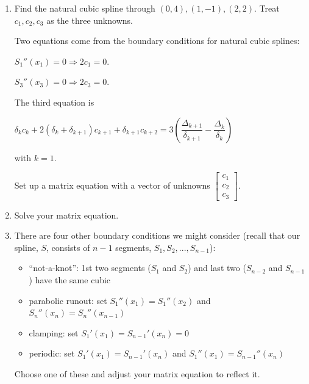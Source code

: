 \documentclass[12pt,letterpaper,noanswers]{exam}
\begin{document}
\begin{enumerate}[resume]
\item Find the natural cubic spline through $(0,4), (1,-1), (2,2)$.  Treat $c_1, c_2, c_3$ as the three unknowns.

Two equations come from the boundary conditions for natural cubic splines:

$S_1''(x_1) = 0 \Rightarrow 2c_1 = 0$.

$S_3''(x_3) = 0 \Rightarrow 2c_3 = 0$.

The third equation is

$\delta_k c_k + 2(\delta_k+\delta_{k+1})c_{k+1} + \delta_{k+1}c_{k+2} =3 \left(\dfrac{\Delta_{k+1}}{\delta_{k+1}} - \dfrac{\Delta_k}{\delta_k}\right)$

with $k = 1$.

Set up a matrix equation with a vector of unknowns $\left[\begin{array}{c} c_1 \\ c_2 \\ c_3 \end{array}\right]$.

\vspace{1in}

\item Solve your matrix equation.
\vspace{1in}

\item There are four other boundary conditions we might consider (recall that our spline, $S$, consists of $n-1$ segments, $S_1, S_2, ..., S_{n-1}$):
\begin{itemize}
 \item ``not-a-knot'': 1st two segments ($S_1$ and $S_2$) and last two ($S_{n-2}$ and $S_{n-1}$) have the same cubic
    \item parabolic runout: set $S_1''(x_1) = S_1''(x_2)$ and $S_n''(x_n) = S_n''(x_{n-1})$
    \item clamping: set $S_1'(x_1) = S_{n-1}'(x_n) = 0$
    \item periodic: set $S_1'(x_1) = S_{n-1}'(x_n)$ and $S_1''(x_1) = S_{n-1}''(x_n)$
\end{itemize}
Choose one of these and adjust your matrix equation to reflect it.

\vspace{1in}
\end{enumerate}
\end{document}
